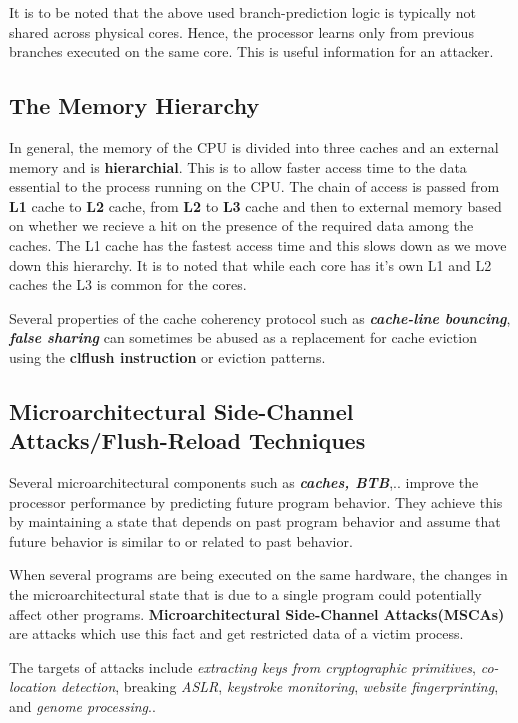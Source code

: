 \documentclass[12pt]{article}
\begin{document}
\begin{appendices}
	It is to be noted that the above used branch-prediction logic is typically not shared across physical cores. Hence, the processor learns only from previous branches executed on the same core. This is useful information for an attacker.
	\subsection{The Memory Hierarchy}
	In general, the memory of the CPU is divided into three caches and an external memory and is \textbf{hierarchial}. This is to allow faster access time to the data essential to the process running on the CPU. The chain of access is passed from \textbf{L1} cache to \textbf{L2} cache, from \textbf{L2} to \textbf{L3} cache and then to external memory based on whether we recieve a hit on the presence of the required data among the caches. The L1 cache has the fastest  access time and this slows down as we move down this hierarchy. It is to noted that while each core has it's own L1 and L2 caches the L3 is common for the cores.
	
	
	Several properties of the cache coherency protocol such as \textbf{\textit{cache-line bouncing}}, \textbf{\textit{false sharing}} can sometimes be abused as a replacement for cache eviction using the \textbf{clflush instruction} or eviction patterns.
	\subsection{Microarchitectural Side-Channel Attacks/Flush-Reload Techniques}
	Several microarchitectural components such as \textbf{\textit{caches, BTB}},.. improve the processor performance by predicting future program behavior. They achieve this by maintaining a state that depends on past program behavior and assume that future behavior is similar to or related to past behavior. 
	
	When several programs are being executed on the same hardware, the changes in the microarchitectural state that is due to a single program could potentially affect other programs. \textbf{Microarchitectural Side-Channel Attacks(MSCAs)} are attacks which use this fact and get restricted data of a victim process.
	
	The targets of attacks include \textit{extracting keys from cryptographic primitives}, \textit{co-location detection}, breaking \textit{ASLR}, \textit{keystroke monitoring}, \textit{website fingerprinting}, and \textit{genome processing}..
	

\end{appendices}
\end{document}
